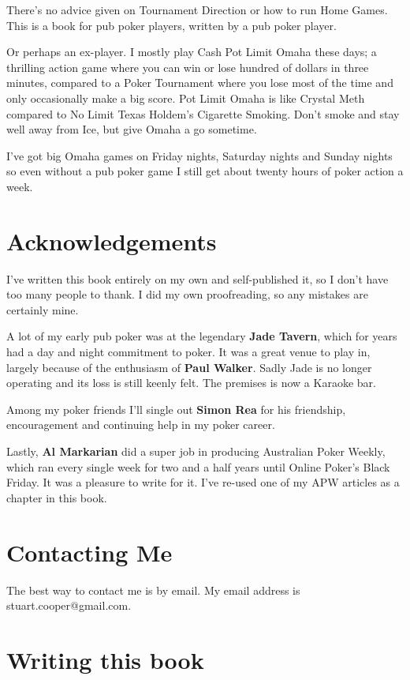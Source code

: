 There's no advice given on Tournament Direction or how to run Home
Games. This is a book for pub poker players, written by a pub poker
player.

Or perhaps an ex-player. I mostly play Cash Pot Limit Omaha these days;
a thrilling action game where you can win or lose hundred of dollars
in three minutes, compared to a Poker Tournament where you lose most of
the time and only occasionally make a big score. Pot Limit Omaha
is like Crystal Meth compared to No Limit Texas Holdem's Cigarette
Smoking. Don't smoke and stay well away from Ice, but give Omaha a go
sometime.

I've got big Omaha games on Friday nights, Saturday nights and Sunday
nights so even without a pub poker game I still get about twenty hours
of poker action a week.


\section{Acknowledgements}

I've written this book entirely on my own and self-published it, so I don't
have too many people to thank. I did my own proofreading, so any mistakes
are certainly mine.

A lot of my early pub poker was at the legendary \textbf{Jade Tavern},
which for years had a day and night commitment to poker.
It was a great venue to play in, largely because of the enthusiasm
of \textbf{Paul Walker}. Sadly Jade is no longer operating and
its loss is still keenly felt. The premises is now a Karaoke bar.

Among my poker friends I'll single out \textbf{Simon Rea} for his friendship,
encouragement and continuing help in my poker career.

Lastly, \textbf{Al Markarian} did a super job in producing Australian
Poker Weekly, which ran every single week for two and a half years
until Online Poker's Black Friday. It was a pleasure to write for
it. I've re-used one of my APW articles as a chapter in this book.

\section{Contacting Me}

The best way to contact me is by email. My email address
is stuart.cooper@gmail.com.

\section{Writing this book}

